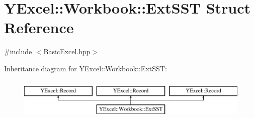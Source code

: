 \hypertarget{struct_y_excel_1_1_workbook_1_1_ext_s_s_t}{}\section{Y\+Excel\+:\+:Workbook\+:\+:Ext\+S\+S\+T Struct Reference}
\label{struct_y_excel_1_1_workbook_1_1_ext_s_s_t}


{\ttfamily \#include $<$Basic\+Excel.\+hpp$>$}

Inheritance diagram for Y\+Excel\+:\+:Workbook\+:\+:Ext\+S\+S\+T\+:\begin{figure}[H]
\begin{center}
\leavevmode
\includegraphics[height=2.000000cm]{struct_y_excel_1_1_workbook_1_1_ext_s_s_t}
\end{center}
\end{figure}
